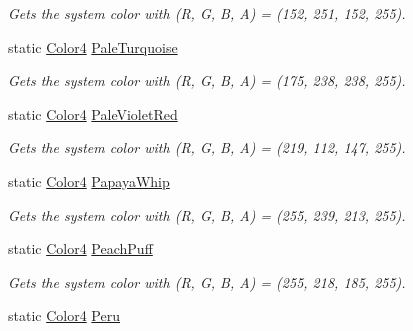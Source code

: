 \begin{DoxyCompactItemize}
\begin{DoxyCompactList}\small\item\em Gets the system color with (R, G, B, A) = (152, 251, 152, 255). \end{DoxyCompactList}\item 
static \hyperlink{struct_open_t_k_1_1_graphics_1_1_color4}{Color4} \hyperlink{struct_open_t_k_1_1_graphics_1_1_color4_abbea7a75f1474260274ede8e11fe15c6}{Pale\-Turquoise}
\begin{DoxyCompactList}\small\item\em Gets the system color with (R, G, B, A) = (175, 238, 238, 255). \end{DoxyCompactList}\item 
static \hyperlink{struct_open_t_k_1_1_graphics_1_1_color4}{Color4} \hyperlink{struct_open_t_k_1_1_graphics_1_1_color4_a7887d0bfdd73e5f14be9484169bd89a9}{Pale\-Violet\-Red}
\begin{DoxyCompactList}\small\item\em Gets the system color with (R, G, B, A) = (219, 112, 147, 255). \end{DoxyCompactList}\item 
static \hyperlink{struct_open_t_k_1_1_graphics_1_1_color4}{Color4} \hyperlink{struct_open_t_k_1_1_graphics_1_1_color4_a5fdcc205c4a91df03ab63f2b00f310bd}{Papaya\-Whip}
\begin{DoxyCompactList}\small\item\em Gets the system color with (R, G, B, A) = (255, 239, 213, 255). \end{DoxyCompactList}\item 
static \hyperlink{struct_open_t_k_1_1_graphics_1_1_color4}{Color4} \hyperlink{struct_open_t_k_1_1_graphics_1_1_color4_a6dcf319fd510a7e1271ffa06598ef96c}{Peach\-Puff}
\begin{DoxyCompactList}\small\item\em Gets the system color with (R, G, B, A) = (255, 218, 185, 255). \end{DoxyCompactList}\item 
static \hyperlink{struct_open_t_k_1_1_graphics_1_1_color4}{Color4} \hyperlink{struct_open_t_k_1_1_graphics_1_1_color4_a365d1c5aa547d95a11d06fe1e89bada6}{Peru}

\end{DoxyCompactItemize}
